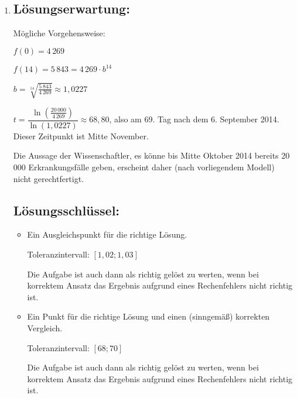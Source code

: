 \begin{langesbeispiel}
{\begin{enumerate}
 
	\subsection{Lösungsschlüssel:}
	\begin{itemize}
		\item Ein Punkt für eine (sinngemäß) korrekte Deutung beider Ausdrücke.
		\item Ein Punkt für die Angabe der beiden korrekten Werte und die Angabe der entsprechenden angemessenen Modellierung. 
		
		Toleranzintervall für den exponentiellen Wert: $[5\,450; 5\,960]$

	\end{itemize}
	
	\item \subsection{Lösungserwartung:}
			
Mögliche Vorgehensweise:

$f(0)=4\,269$

$f(14)=5\,843=4\,269\cdot b^{14}$

$b=\sqrt[14]{\frac{5\,843}{4\,269}}\approx 1,0227$\leer

$t=\dfrac{\ln\left(\frac{20\,000}{4\,269}\right)}{\ln(1,0227)}\approx 68,80$, also am 69. Tag nach dem 6. September 2014. Dieser Zeitpunkt ist Mitte November.

Die Aussage der Wissenschaftler, es könne bis Mitte Oktober 2014 bereits 20\,000 Erkrankungsfälle geben, erscheint daher (nach vorliegendem Modell) nicht gerechtfertigt.

	
	\subsection{Lösungsschlüssel:}
	
\begin{itemize}
	\item Ein Ausgleichspunkt für die richtige Lösung. 
	
	Toleranzintervall: $[1,02; 1,03]$  
	
	Die Aufgabe ist auch dann als richtig gelöst zu werten, wenn bei korrektem Ansatz das Ergebnis aufgrund eines Rechenfehlers nicht richtig ist. 
	\item  Ein Punkt für die richtige Lösung und einen (sinngemäß) korrekten Vergleich. 
	
	Toleranzintervall: $[68; 70]$ 
	
	Die Aufgabe ist auch dann als richtig gelöst zu werten, wenn bei korrektem Ansatz das Ergebnis aufgrund eines Rechenfehlers nicht richtig ist.  
\end{itemize}

\end{enumerate}}
		\end{langesbeispiel}